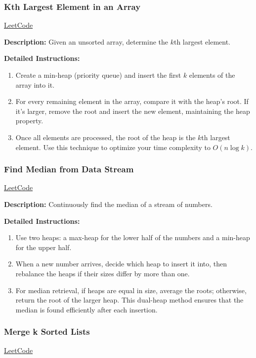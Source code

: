 \subsubsection{Kth Largest Element in an Array}
\href{https://leetcode.com/problems/kth-largest-element-in-an-array/}{LeetCode}

\textbf{Description:} Given an unsorted array, determine the $k$th largest element.

\textbf{Detailed Instructions:}
\begin{enumerate}
    \item Create a min-heap (priority queue) and insert the first $k$ elements of the array into it.
    \item For every remaining element in the array, compare it with the heap’s root. If it’s larger, remove the root and insert the new element, maintaining the heap property.
    \item Once all elements are processed, the root of the heap is the $k$th largest element. Use this technique to optimize your time complexity to $O(n \log k)$.
\end{enumerate}

\subsubsection{Find Median from Data Stream}
\href{https://leetcode.com/problems/find-median-from-data-stream/}{LeetCode}

\textbf{Description:} Continuously find the median of a stream of numbers.

\textbf{Detailed Instructions:}
\begin{enumerate}
    \item Use two heaps: a max-heap for the lower half of the numbers and a min-heap for the upper half.
    \item When a new number arrives, decide which heap to insert it into, then rebalance the heaps if their sizes differ by more than one.
    \item For median retrieval, if heaps are equal in size, average the roots; otherwise, return the root of the larger heap. This dual-heap method ensures that the median is found efficiently after each insertion.
\end{enumerate}

\subsubsection{Merge k Sorted Lists}
\href{https://leetcode.com/problems/merge-k-sorted-lists/}{LeetCode}

